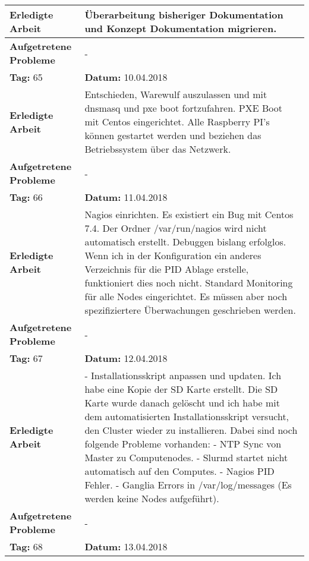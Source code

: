 \begin{longtable}{|p{5cm}|p{5cm}p{6cm}|}
\textbf{Erledigte Arbeit} & \multicolumn{2}{p{11cm}|}{Überarbeitung bisheriger Dokumentation und Konzept Dokumentation migrieren.} \\ \hline
\textbf{Aufgetretene Probleme} & \multicolumn{2}{p{11cm}|}{-} \\ \hline
\rowcolor{heading}\textbf{Tag:} 65 & \textbf{Datum:} 10.04.2018 & \\ \hline
\textbf{Erledigte Arbeit} & \multicolumn{2}{p{11cm}|}{Entschieden, Warewulf auszulassen und mit dnsmasq und pxe boot fortzufahren. PXE Boot mit Centos eingerichtet. Alle Raspberry PI's können gestartet werden und beziehen das Betriebssystem über das Netzwerk.} \\ \hline
\textbf{Aufgetretene Probleme} & \multicolumn{2}{p{11cm}|}{-} \\ \hline
\rowcolor{heading}\textbf{Tag:} 66 & \textbf{Datum:} 11.04.2018 & \\ \hline
\textbf{Erledigte Arbeit} & \multicolumn{2}{p{11cm}|}{Nagios einrichten. Es existiert ein Bug mit Centos 7.4. Der Ordner /var/run/nagios wird nicht automatisch erstellt. Debuggen bislang erfolglos. Wenn ich in der Konfiguration ein anderes Verzeichnis für die PID Ablage erstelle, funktioniert dies noch nicht. Standard Monitoring für alle Nodes eingerichtet. Es müssen aber noch spezifiziertere Überwachungen geschrieben werden.} \\ \hline
\textbf{Aufgetretene Probleme} & \multicolumn{2}{p{11cm}|}{-} \\ \hline
\rowcolor{heading}\textbf{Tag:} 67 & \textbf{Datum:} 12.04.2018 & \\ \hline
\textbf{Erledigte Arbeit} & \multicolumn{2}{p{11cm}|}{- Installationsskript anpassen und updaten. Ich habe eine Kopie der SD Karte erstellt. Die SD Karte wurde danach gelöscht und ich habe mit dem automatisierten Installationsskript versucht, den Cluster wieder zu installieren. Dabei sind noch folgende Probleme vorhanden: \newline - NTP Sync von Master zu Computenodes. \newline
- Slurmd startet nicht automatisch auf den Computes. \newline 
- Nagios PID Fehler. \newline 
- Ganglia Errors in /var/log/messages (Es werden keine Nodes aufgeführt).} \\ \hline
\textbf{Aufgetretene Probleme} & \multicolumn{2}{p{11cm}|}{-} \\ \hline
\rowcolor{heading}\textbf{Tag:} 68 & \textbf{Datum:} 13.04.2018 & \\ \hline

\end{longtable}
